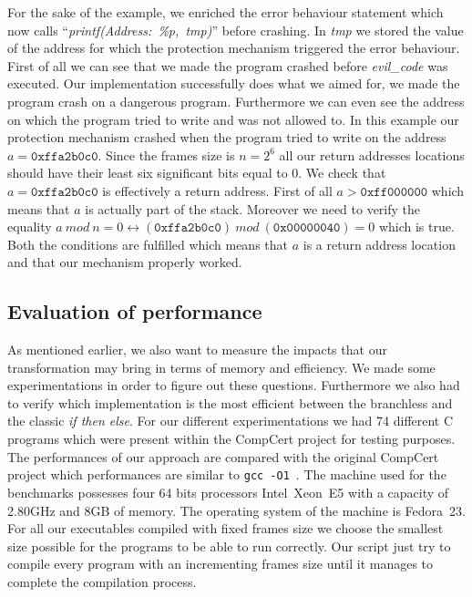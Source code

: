 \documentclass[11pt]{sdm}
\begin{document}
For the sake of the example, we enriched the error behaviour statement which now calls  ``\textit{printf(Address:~\%p,~tmp)}'' before crashing. In \textit{tmp} we stored the value of the address for which the protection mechanism triggered the error behaviour.
First of all we can see that we made the program crashed before \textit{evil\_code} was executed. Our implementation successfully does what we aimed for, we made the program crash on a dangerous program.
Furthermore we can even see the address on which the program tried to write and was not allowed to. In this example our protection mechanism crashed when the program tried to write on the address $a=\texttt{0xffa2b0c0}$. 
Since the frames size is $n=2^6$ all our return addresses locations should have their least six significant bits equal to 0.
We check that $a=\texttt{0xffa2b0c0}$ is effectively a return address. First of all $a>\texttt{0xff000000}$ which means that $a$ is actually part of the stack. Moreover we need to verify the equality $a~mod~n=0 \leftrightarrow (\texttt{0xffa2b0c0})~mod~(\texttt{0x00000040}) = 0$ which is true. 
Both the conditions are fulfilled which means that $a$ is a return address location and that our mechanism properly worked.


\subsection{Evaluation of performance}

As mentioned earlier, we also want to measure the impacts that our transformation may bring in terms of memory and efficiency.
We made some experimentations in order to figure out these questions.
Furthermore we also had to verify which implementation is the most efficient between the branchless and the classic \textit{if then else}.
For our different experimentations we had 74 different C programs which were present within the CompCert project for testing purposes.
The performances of our approach are compared with the original CompCert project which performances are similar to \texttt{gcc -O1}~\cite{Leroy:2009:FVR:1538788.1538814}.
The machine used for the benchmarks possesses four 64 bits processors Intel~Xeon~E5 with a capacity of 2.80GHz and 8GB of memory. The operating system of the machine is Fedora~23.
For all our executables compiled with fixed frames size we choose the smallest size possible for the programs to be able to run correctly. Our script just try to compile every program with an incrementing frames size until it manages to complete the compilation process.
\end{document}
